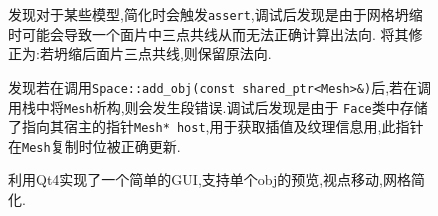 \begin{enumerate}
\begin{figure}[H]
\item 发现对于某些模型,简化时会触发\verb|assert|,调试后发现是由于网格坍缩时可能会导致一个面片中三点共线从而无法正确计算出法向.
  将其修正为:若坍缩后面片三点共线,则保留原法向.

  \item 发现若在调用\verb|Space::add_obj(const shared_ptr<Mesh>&)|后,若在调用栈中将\verb|Mesh|析构,则会发生段错误.调试后发现是由于
    \verb|Face|类中存储了指向其宿主的指针\verb|Mesh* host|,用于获取插值及纹理信息用,此指针在\verb|Mesh|复制时位被正确更新.

    \item 利用Qt4实现了一个简单的GUI,支持单个obj的预览,视点移动,网格简化.

\end{figure}


\end{enumerate}
